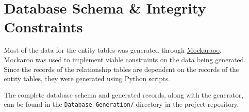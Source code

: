 \section{Database Schema \& Integrity Constraints}

Most of the data for the entity tables was generated through \href{https://www.mockaroo.com/}{Mockaraoo}.
Mockaroo was used to implement viable constraints on the data being generated.
Since the records of the relationship tables are dependent on the records of the entity tables, they were generated using Python scripts.

The complete database schema and generated records, along with the generator, can be found in the \texttt{Database-Generation/} directory in the project repository.